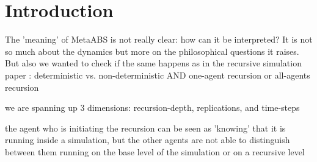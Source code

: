 \section{Introduction}
The 'meaning' of MetaABS is not really clear: how can it be interpreted?
It is not so much about the dynamics but more on the philosophical questions it raises.
But also we wanted to check if the same happens as in the recursive simulation paper \cite{gilmer_recursive_2000} : deterministic vs. non-deterministic AND one-agent recursion or all-agents recursion

we are spanning up 3 dimensions: recursion-depth, replications, and time-steps

the agent who is initiating the recursion can be seen as 'knowing' that it is running inside a simulation, but the other agents are not able to distinguish between them running on the base level of the simulation or on a recursive level